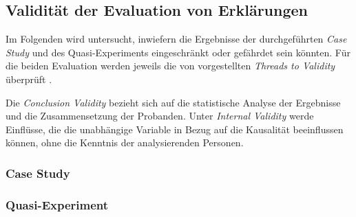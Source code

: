 \subsection{Validität der Evaluation von Erklärungen}

Im Folgenden wird untersucht, inwiefern die Ergebnisse der durchgeführten \textit{Case Study} und des Quasi-Experiments eingeschränkt oder gefährdet sein könnten. Für die beiden Evaluation werden jeweils die von \citeauthor{wohlin2012experimentation} vorgestellten \textit{Threads to Validity} überprüft \cite{wohlin2012experimentation}.

Die \textit{Conclusion Validity} bezieht sich auf die statistische Analyse der Ergebnisse und die Zusammensetzung der Probanden. Unter \textit{Internal Validity} werde Einflüsse, die die unabhängige Variable in Bezug auf die Kausalität beeinflussen können, ohne die Kenntnis der analysierenden Personen.

\subsubsection{Case Study}

\subsubsection{Quasi-Experiment}

